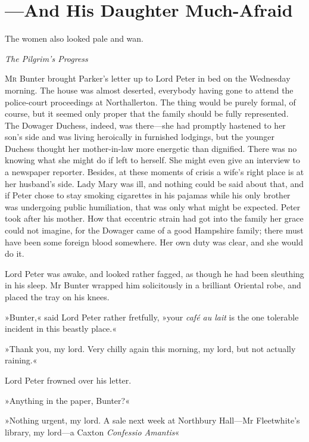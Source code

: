 
\chapter{—And His Daughter Much-Afraid}

\epigraph{The women also looked pale and wan.}{\textit{The Pilgrim's Progress}}


\lettrine[lines=4]{M}{r} Bunter brought Parker's letter up to Lord Peter in bed on the Wednesday morning. The house was almost deserted, everybody having gone to attend the police-court proceedings at Northallerton. The thing would be purely formal, of course, but it seemed only proper that the family should be fully represented. The Dowager Duchess, indeed, was there\allowbreak---\allowbreak she had promptly hastened to her son's side and was living heroically in furnished lodgings, but the younger Duchess thought her mother-in-law more energetic than dignified. There was no knowing what she might do if left to herself. She might even give an interview to a newspaper reporter. Besides, at these moments of crisis a wife's right place is at her husband's side. Lady Mary was ill, and nothing could be said about that, and if Peter chose to stay smoking cigarettes in his pajamas while his only brother was undergoing public humiliation, that was only what might be expected. Peter took after his mother. How that eccentric strain had got into the family her grace could not imagine, for the Dowager came of a good Hampshire family; there must have been some foreign blood somewhere. Her own duty was clear, and she would do it.

Lord Peter was awake, and looked rather fagged, as though he had been sleuthing in his sleep. Mr Bunter wrapped him solicitously in a brilliant Oriental robe, and placed the tray on his knees.

»Bunter,« said Lord Peter rather fretfully, »your \textit{café au lait} is the one tolerable incident in this beastly place.«

»Thank you, my lord. Very chilly again this morning, my lord, but not actually raining.«

Lord Peter frowned over his letter.

»Anything in the paper, Bunter?«

»Nothing urgent, my lord. A sale next week at Northbury Hall\allowbreak---\allowbreak Mr  Fleetwhite's library, my lord\allowbreak---\allowbreak a Caxton \textit{Confessio Amantis}\longdash«

